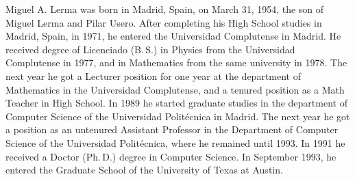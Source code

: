 \documentclass[12pt]{report} %
\theoremstyle{definition}
\theoremstyle{remark}
\begin{document}

\begin{vita}
%

Miguel A. Lerma 
%
was born in Madrid, Spain, on March 31, 1954, 
the son of Miguel Lerma and Pilar Usero. After completing his 
High School studies in Madrid, Spain, in 1971, he entered 
the Universidad Complutense in Madrid. 
He received degree of Licenciado (B.\,S.) in Physics 
from the Universidad Complutense in 1977, 
and in Mathematics from the same university in 1978. 
The next year he got a Lecturer 
position for one year at the department of Mathematics 
in the Universidad Complutense, and a tenured position 
as a Math Teacher in High School. In 1989 he started 
graduate studies in the department of Computer Science 
of the Universidad Polit\'ecnica in Madrid. The next year 
he got a position as an untenured 
Assistant Professor in the Department of Computer Science 
of the Universidad Polit\'ecnica, where he remained until 
1993. In 1991 he received a Doctor (Ph.\,D.) degree 
in Computer Science. In September 1993, he entered 
the Graduate School of the University of Texas at Austin.

\end{vita}
\end{document}
